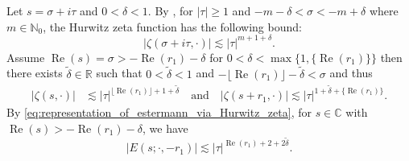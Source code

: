 \documentclass[]{article}
\renewcommand{\Re}{\operatorname{Re}}
\begin{document}
Let $s=\sigma+i\tau$ and $0<\delta<1$. By \cite[Theorem 12.23]{apostol}, for $|\tau|\geq 1$ and  $-m-\delta < \sigma<-m+\delta$ where   $m\in\mathbb{N}_0$, the Hurwitz zeta function has the following bound:
 \begin{equation}
  |  \zeta(\sigma + i \tau, \cdot ) |   \lesssim |\tau|^{m+1+\delta}.
  \end{equation} 
Assume $\Re(s)=\sigma >-\Re(r_1)-\delta$ for $0<\delta<\max\{1,\{\Re(r_1)\}\}$ then there exists $\widetilde\delta \in \mathbb{R}$ such that  $0<\widetilde\delta<1$ and $-\lfloor \Re(r_1)\rfloor-\widetilde\delta<\sigma$ and thus
\begin{equation}
\begin{split}
  |  \zeta(s, \cdot ) | &  \lesssim |\tau|^{\lfloor{\Re(r_1)}\rfloor+1+\widetilde\delta}  \quad\text{and}\quad   
  |  \zeta(s+r_1, \cdot ) |  \lesssim |\tau|^{1+\widetilde\delta + \{ \Re(r_1)\}}.
\end{split}
\end{equation}
By \eqref{eq:representation_of_estermann_via_Hurwitz_zeta}, for $s \in \mathbb{C}$ with $\Re(s) > - \Re(r_1)-\delta$, we have 
\begin{equation}\label{eq:elemetary_estimate_on_Estermann_zeta}
|    E(s; \cdot  , -r_1) | \lesssim |\tau|^{\Re(r_1)+2+2 \widetilde\delta}.
\end{equation}
\end{document}
